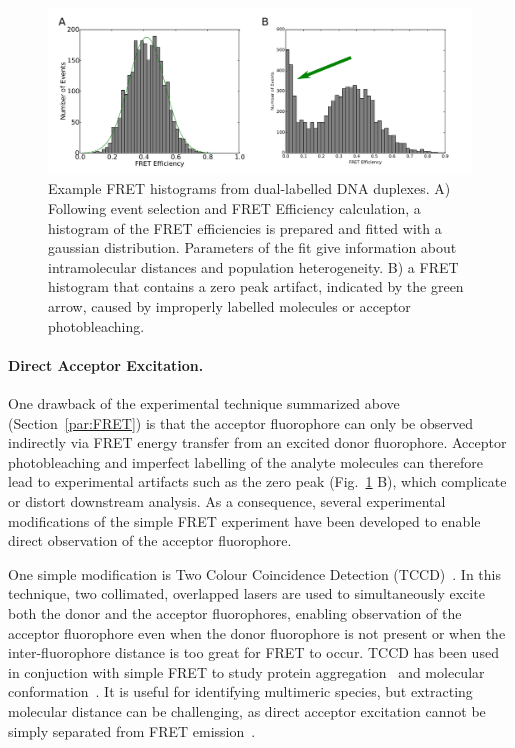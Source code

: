 \begin{figure}[!ht]
   \begin{center}
      \includegraphics*[clip=true, width=6in]{introduction/FRET_AND_zero.pdf}
      \caption{Example FRET histograms from dual-labelled DNA duplexes. A) Following event selection and FRET Efficiency calculation, a histogram of the FRET efficiencies is prepared and fitted with a gaussian distribution. Parameters of the fit give information about intramolecular distances and population heterogeneity. B) a FRET histogram that contains a zero peak artifact, indicated by the green arrow, caused by improperly labelled molecules or acceptor photobleaching.}
      \label{fig:histogram}
   \end{center}
\end{figure}

\paragraph{Direct Acceptor Excitation.}
One drawback of the experimental technique summarized above (Section~\ref{par:FRET}) is that the acceptor fluorophore can only be observed indirectly via FRET energy transfer from an excited donor fluorophore. Acceptor photobleaching and imperfect labelling of the analyte molecules can therefore lead to experimental artifacts such as the zero peak (Fig.~\ref{fig:histogram} B), which complicate or distort downstream analysis. As a consequence, several experimental modifications of the simple FRET experiment have been developed to enable direct observation of the acceptor fluorophore.

One simple modification is Two Colour Coincidence Detection (TCCD)~\cite{orte06, orte10}. In this technique, two collimated, overlapped lasers are used to simultaneously excite both the donor and the acceptor fluorophores, enabling observation of the acceptor fluorophore even when the donor fluorophore is not present or when the inter-fluorophore distance is too great for FRET to occur. TCCD has been used in conjuction with simple FRET to study protein aggregation~\cite{cremades2012} and molecular conformation~\cite{Ye2012}. It is useful for identifying multimeric species, but extracting molecular distance can be challenging, as direct acceptor excitation cannot be simply separated from FRET emission~\cite{orte08_3}.  

